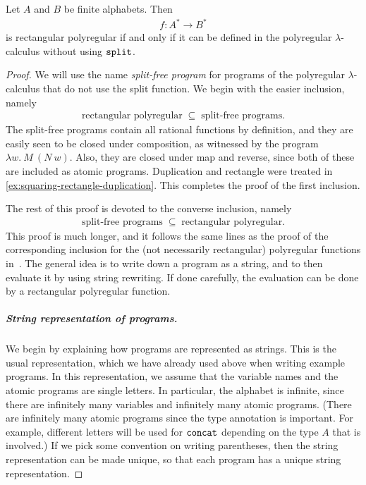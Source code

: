 \documentclass[a4paper,UKenglish,cleveref, autoref, thm-restate]{lipics-v2021}
\begin{document}
\begin{theorem}\label{thm:rectangular-polyregular-programs-split-free}
    Let $A$ and $B$ be finite alphabets. Then 
    \begin{align*}
    f : A^* \to B^*
    \end{align*}
    is  rectangular polyregular if and only if it can be defined in  the polyregular $\lambda$-calculus without using $\mathtt{split}$.
\end{theorem}
\begin{proof}
    We will use the name \emph{split-free program} for programs of the polyregular $\lambda$-calculus that do not use the split function. We begin with the easier inclusion, namely 
    \begin{align*}
    \text{rectangular polyregular} 
    \; \subseteq \;
    \text{split-free programs}.
    \end{align*}
    The split-free programs contain all rational functions by definition, and they are easily seen to be closed under composition, as witnessed by the program 
    $ \lambda w.\ M\  (N\  w).$
    Also, they are closed under map and reverse, since both of these are included as atomic programs. Duplication and rectangle were treated in \cref{ex:squaring-rectangle-duplication}.
    This completes the proof of the first inclusion. 

    The rest of this proof is devoted to the converse inclusion, namely
    \begin{align*}
    \text{split-free programs} 
    \; \subseteq \; 
    \text{rectangular polyregular}.
    \end{align*}
    This proof is much longer, and it  follows the same lines as the proof of the corresponding inclusion for the  (not necessarily rectangular) polyregular functions in~\cite[Theorem 4.1]{polyregular-survey}. The general idea is to 
write down a program as a string, and to then evaluate it by using string rewriting. If done carefully, the evaluation can be done by a rectangular polyregular function.


    \subparagraph*{String representation of programs.} We begin by explaining how programs are represented as strings. This is the usual representation, which we have already used above when writing example programs. In this representation, we assume that the variable names and the atomic programs are single letters. In particular, the alphabet is infinite, since there are infinitely many variables and infinitely many atomic programs.  (There are infinitely many atomic programs  since the type annotation is important. For example, different letters will be used for $\mathtt{concat}$ depending on the type $A$ that is involved.) If we pick some convention on writing parentheses, then the string representation can be made unique, so that each program has a unique string representation.
    

\end{proof}
\end{document}
